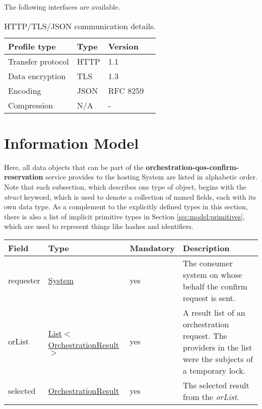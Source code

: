 \documentclass[a4paper]{arrowhead}
\newcommand{\pref}[1]{{\textcolor{ArrowheadGrey}{\hyperref[sec:model:primitives:#1]{#1}}}}
\begin{document}
The following interfaces are available.


\begin{table}[ht!]
  \centering
  \begin{tabular}{|l|l|l|l|}
    \rowcolor{gray!33} Profile type & Type & Version \\ \hline
    Transfer protocol & HTTP & 1.1 \\ \hline
    Data encryption & TLS & 1.3 \\ \hline
    Encoding & JSON & RFC 8259 \cite{rfc8259} \\ \hline
    Compression & N/A & - \\ \hline
  \end{tabular}
  \caption{HTTP/TLS/JSON communication details.}
  \label{tab:comunication_semantics_profile}
\end{table}

\clearpage

\section{Information Model}
\label{sec:model}

Here, all data objects that can be part of the \textbf{orchestration-qos-confirm-reservation} service provides to the hosting System are listed in alphabetic order.
Note that each subsection, which describes one type of object, begins with the \textit{struct} keyword, which is used to denote a collection of named fields, each with its own data type.
As a complement to the explicitly defined types in this section, there is also a list of implicit primitive types in Section \ref{sec:model:primitives}, which are used to represent things like hashes and identifiers.

\label{sec:model:QoSReservationRequest}

\begin{table}[ht!]
\begin{tabularx}{\textwidth}{| p{4cm} | p{4cm} | p{2cm} | X |} \hline
\rowcolor{gray!33} Field & Type & Mandatory & Description \\ \hline
requester & \hyperref[sec:model:System]{System} & yes & The consumer system on whose behalf the confirm request is sent. \\ \hline
orList & \pref{List}$<$\hyperref[sec:model:OrchestrationResult]{OrchestrationResult}$>$ & yes & A result list of an orchestration request. The providers in the list were the subjects of a temporary lock. \\ \hline
selected & \hyperref[sec:model:OrchestrationResult]{OrchestrationResult} & yes & The selected result from the \textit{orList}. \\ \hline
\end{tabularx}
\end{table}
\end{document}
